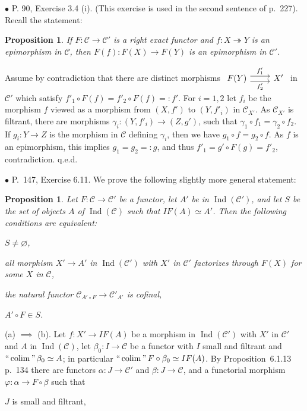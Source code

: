 \documentclass[12pt]{article}
\newtheorem{prop}[thm]{Proposition}
\theoremstyle{remark}%
\newcommand{\bu}{\bullet}
\newcommand{\n}{\noindent}
\newcommand{\cc}{\mathcal}
\newcommand{\C}{\mathcal C}
\newcommand{\epi}{\twoheadrightarrow}
\newcommand{\p}{\varphi}
\newcommand{\pr}{Proposition}
\DeclareMathOperator*{\coli}{colim}
\DeclareMathOperator*{\ic}{``\coli"}
\DeclareMathOperator{\Ind}{Ind}
\begin{document}
\n$\bu$ P. 90, Exercise 3.4 (i). (This exercise is used in the second sentence of p.~227). Recall the statement: 
%
\begin{prop}\label{34i}
If $F:\C\to\C'$ is a right exact functor and $f:X\epi Y$ is an epimorphism in $\C$, then $F(f):F(X)\to F(Y)$ is an epimorphism in $\C'$.
\end{prop}
%
\n{\em Proof.} Assume by contradiction that there are distinct morphisms $\begin{tikzcd}F(Y)\ar[yshift=.7ex]{r}{f'_1}\ar[yshift=-.7ex]{r}[swap]{f'_2}&X'\end{tikzcd}$ in $\C'$ which satisfy 
$
f'_1\circ F(f)=f'_2\circ F(f)=:f'.
$ 
For $i=1,2$ let $f_i$ be the morphism $f$ viewed as a morphism from $(X,f')$ to $(Y,f'_i)$ in $\C_{X'}$. As $\C_{X'}$ is filtrant, there are morphisms $\gamma_i:(Y,f'_i)\to(Z,g')$, such that $\gamma_1\circ f_1=\gamma_2\circ f_2$. If $g_i:Y\to Z$ is the morphism in $\C$ defining $\gamma_i$, then we have $g_1\circ f=g_2\circ f$. As $f$ is an epimorphism, this implies $g_1=g_2=:g$, and thus $f'_1=g'\circ F(g)=f'_2$, contradiction. q.e.d.


\n$\bu$ P.~147, Exercise 6.11. We prove the following slightly more general statement: 
% 
\begin{prop}
%
Let $F:\cc C\to\cc C'$ be a functor, let $A'$ be in $\Ind(\cc C')$, and let $S$ be the set of objects $A$ of $\Ind(\cc C)$ such that $IF(A)\simeq A'$. Then the following conditions are equivalent: 

\n{\em(a)} $S\neq\varnothing$, 

\n{\em(b)} all morphism $X'\to A'$ in $\Ind(\cc C')$ with $X'$ in $\cc C'$ factorizes through $F(X)$ for some $X$ in $\cc C$, 

\n{\em(c)} the natural functor $\cc C_{A'\circ F}\to\cc C'_{A'}$ is cofinal, 

\n{\em(d)} $A'\circ F\in S$.
%
\end{prop}
%
\n{\em Proof.} 

\n(a) $\implies$ (b). Let $f:X'\to IF(A)$ be a morphism in $\Ind(\cc C')$ with $X'$ in $\cc C'$ and $A$ in $\Ind(\cc C)$, let $\beta_0:I\to\cc C$ be a functor with $I$ small and filtrant and $\ic\beta_0\simeq A$; in particular $\ic F\circ\beta_0\simeq IF(A)$. By \pr\ 6.1.13 p.~134 there are functors $\alpha:J\to\cc C'$ and $\beta:J\to\cc C$, and a functorial morphism $\p:\alpha\to F\circ\beta$ such that 

$J$ is small and filtrant, 
\end{document}
